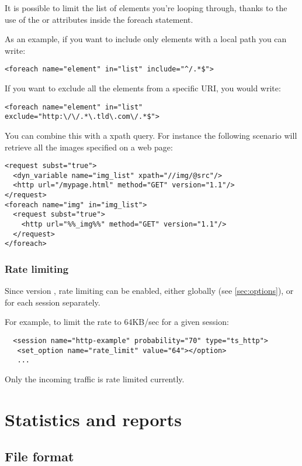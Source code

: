 \documentclass{TSUNG-en}
\begin{document}
It is possible to limit the list of elements you're looping through, thanks to the use of the  or  attributes inside the foreach statement.

As an example, if you want to include only elements with a local path you can write:

\begin{Verbatim}
<foreach name="element" in="list" include="^/.*$">
\end{Verbatim}

If you want to exclude all the elements from a specific URI, you would write:

\begin{Verbatim}
<foreach name="element" in="list" exclude="http:\/\/.*\.tld\.com\/.*$">
\end{Verbatim}

You can combine this with a xpath query. For instance the following scenario will retrieve all the images specified on a web page:

\begin{Verbatim}
<request subst="true">
  <dyn_variable name="img_list" xpath="//img/@src"/>
  <http url="/mypage.html" method="GET" version="1.1"/>
</request>
<foreach name="img" in="img_list">
  <request subst="true">
    <http url="%%_img%%" method="GET" version="1.1"/>
  </request>
</foreach>
\end{Verbatim}

\subsubsection{Rate limiting}

Since version , rate limiting can be enabled, either globally
(see \ref{sec:options}), or for each session separately. 

For example, to limit the rate to 64KB/sec for a given session:
\begin{Verbatim}
  <session name="http-example" probability="70" type="ts_http">
   <set_option name="rate_limit" value="64"></option>
   ...
\end{Verbatim}

Only the incoming traffic is rate limited currently.

\section{Statistics and reports}
\label{sec:statistics-reports}
\subsection{File format}
\end{document}
